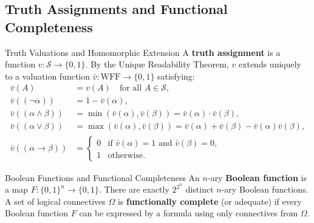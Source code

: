 \subsection{Truth Assignments and Functional Completeness}

\begin{definitionbox}{Truth Valuations and Homomorphic Extension}
A \textbf{truth assignment} is a function $v: \mathcal{S} \to \{0, 1\}$. By the Unique Readability Theorem, $v$ extends uniquely to a valuation function $\bar{v}: \mathrm{WFF} \to \{0, 1\}$ satisfying:
\begin{align*}
\bar{v}(A) &= v(A) \quad \text{for all } A \in \mathcal{S}, \\
\bar{v}((\neg \alpha)) &= 1 - \bar{v}(\alpha), \\
\bar{v}((\alpha \land \beta)) &= \min(\bar{v}(\alpha), \bar{v}(\beta)) = \bar{v}(\alpha) \cdot \bar{v}(\beta), \\
\bar{v}((\alpha \lor \beta)) &= \max(\bar{v}(\alpha), \bar{v}(\beta)) = \bar{v}(\alpha) + \bar{v}(\beta) - \bar{v}(\alpha)\bar{v}(\beta), \\
\bar{v}((\alpha \to \beta)) &= \begin{cases} 0 & \text{if } \bar{v}(\alpha) = 1 \text{ and } \bar{v}(\beta) = 0, \\ 1 & \text{otherwise}. \end{cases}
\end{align*}
\end{definitionbox}

\begin{definitionbox}{Boolean Functions and Functional Completeness}
An $n$-ary \textbf{Boolean function} is a map $F: \{0, 1\}^n \to \{0, 1\}$. There are exactly $2^{2^n}$ distinct $n$-ary Boolean functions.
A set of logical connectives $\Omega$ is \textbf{functionally complete} (or adequate) if every Boolean function $F$ can be expressed by a formula using only connectives from $\Omega$.
\end{definitionbox}

